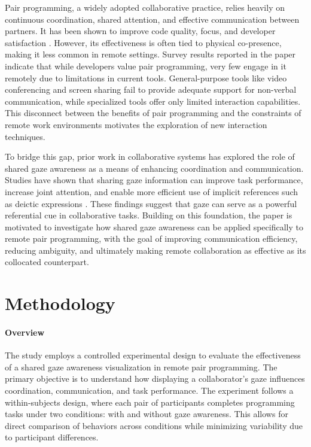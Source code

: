 Pair programming, a widely adopted collaborative practice, relies heavily on continuous coordination, shared attention, and effective communication between partners. It has been shown to improve code quality, focus, and developer satisfaction \cite{hannay2009effectiveness, begel2008pair}. However, its effectiveness is often tied to physical co-presence, making it less common in remote settings. Survey results reported in the paper indicate that while developers value pair programming, very few engage in it remotely due to limitations in current tools. General-purpose tools like video conferencing and screen sharing fail to provide adequate support for non-verbal communication, while specialized tools offer only limited interaction capabilities. This disconnect between the benefits of pair programming and the constraints of remote work environments motivates the exploration of new interaction techniques.

To bridge this gap, prior work in collaborative systems has explored the role of shared gaze awareness as a means of enhancing coordination and communication. Studies have shown that sharing gaze information can improve task performance, increase joint attention, and enable more efficient use of implicit references such as deictic expressions \cite{brennan2008coordinating, schneider2013real}. These findings suggest that gaze can serve as a powerful referential cue in collaborative tasks. Building on this foundation, the paper is motivated to investigate how shared gaze awareness can be applied specifically to remote pair programming, with the goal of improving communication efficiency, reducing ambiguity, and ultimately making remote collaboration as effective as its collocated counterpart.

\section{Methodology}
\paragraph{Overview}
The study employs a controlled experimental design to evaluate the effectiveness of a shared gaze awareness visualization in remote pair programming. The primary objective is to understand how displaying a collaborator's gaze influences coordination, communication, and task performance. The experiment follows a within-subjects design, where each pair of participants completes programming tasks under two conditions: with and without gaze awareness. This allows for direct comparison of behaviors across conditions while minimizing variability due to participant differences.

